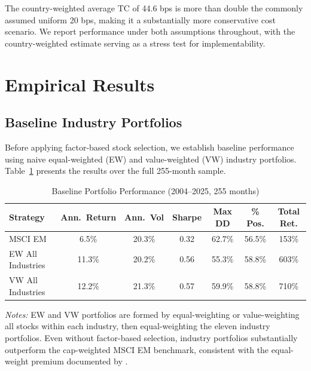 \documentclass[12pt,a4paper]{article}
\begin{document}
The country-weighted average TC of 44.6 bps is more than double the commonly assumed uniform 20 bps, making it a substantially more conservative cost scenario. We report performance under both assumptions throughout, with the country-weighted estimate serving as a stress test for implementability.


\section{Empirical Results}
\label{sec:results}

\subsection{Baseline Industry Portfolios}

Before applying factor-based stock selection, we establish baseline performance using naive equal-weighted (EW) and value-weighted (VW) industry portfolios. Table~\ref{tab:baseline} presents the results over the full 255-month sample.

\begin{table}[H]
\centering
\caption{Baseline Portfolio Performance (2004--2025, 255 months)}
\label{tab:baseline}
\small
\begin{tabular}{lcccccc}
\toprule
\textbf{Strategy} & \textbf{Ann.\ Return} & \textbf{Ann.\ Vol} & \textbf{Sharpe} & \textbf{Max DD} & \textbf{\% Pos.} & \textbf{Total Ret.} \\
\midrule
MSCI EM            & 6.5\%  & 20.3\% & 0.32 & 62.7\% & 56.5\% & 153\% \\
EW All Industries  & 11.3\% & 20.2\% & 0.56 & 55.3\% & 58.8\% & 603\% \\
VW All Industries  & 12.2\% & 21.3\% & 0.57 & 59.9\% & 58.8\% & 710\% \\
\bottomrule
\end{tabular}
\begin{minipage}{\textwidth}
\vspace{0.3em}
\footnotesize
\textit{Notes:} EW and VW portfolios are formed by equal-weighting or value-weighting all stocks within each industry, then equal-weighting the eleven industry portfolios. Even without factor-based selection, industry portfolios substantially outperform the cap-weighted MSCI EM benchmark, consistent with the equal-weight premium documented by \citet{demiguel2009}.
\end{minipage}
\end{table}
\end{document}

